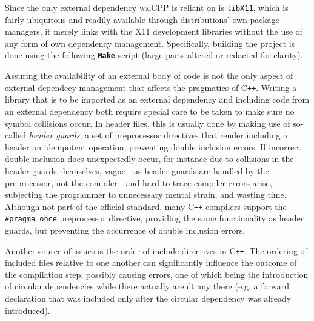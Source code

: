 Since   the  only   external  dependency   \textsc{wmCPP}  is   reliant  on   is
\texttt{libX11},  which  is  fairly  ubiquitous and  readily  available  through
distributions'   own  package   managers,   it  merely   links   with  the   X11
development  libraries   without  the  use   of  any  form  of   own  dependency
management.  Specifically, building  the  project is  done  using the  following
\textbf{\texttt{Make}} script (large parts altered or redacted for clarity).


Assuring the availability of an external body  of code is not the only aspect of
external  dependecy  management that  affects  the  pragmatics of  C\texttt{++}.
Writing a library that is to be imported as an external dependency and including
code from an external  dependency both require special care to  be taken to make
sure no symbol collisions occur. In header files, this is usually done by making
use of so-called  \textit{header guards}, a set of  preprocessor directives that
render including a  header an idempotent operation,  preventing double inclusion
errors. If incorrect double inclusion  does unexpectedly occur, for instance due
to  collisions in  the header  guards themselves,  vague---as header  guards are
handled  by  the preprocessor,  not  the  compiler---and hard-to-trace  compiler
errors  arise,  subjecting the  programmer  to  unnecessary mental  strain,  and
wasting  time. Although  not part  of the  official standard,  many C\texttt{++}
compilers  support the  \texttt{#pragma once}  preprocessor  directive,
providing the same functionality as header guards, but preventing the occurrence
of double inclusion errors.

Another source of issues is the order of include directives in C\texttt{++}. The
ordering of included  files relative to one another  can significantly influence
the outcome of the compilation step, possibly causing errors, one of which being
the introduction of circular dependencies  while there actually aren't any there
(e.g. a forward declaration that was included only after the circular dependency
was already introduced).\\

